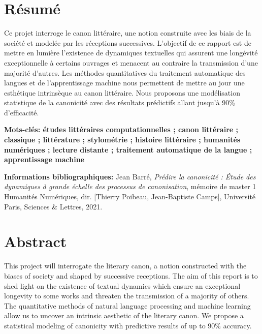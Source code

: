 \section*{Résumé}
Ce projet interroge le canon littéraire, une notion construite avec les biais de la société et modelée par les réceptions successives. L’objectif de ce rapport est de mettre en lumière l’existence de dynamiques textuelles qui assurent une longévité exceptionnelle à certains ouvrages et menacent au contraire la transmission d’une majorité d’autres. Les méthodes quantitatives du traitement automatique des langues et de l'apprentissage machine nous permettent de mettre au jour une esthétique intrinsèque au canon littéraire. Nous proposons une modélisation statistique de la canonicité avec des résultats prédictifs allant jusqu'à 90\% d'efficacité.




\medskip

\textbf{Mots-clés: études littéraires computationnelles ; canon littéraire ; classique ; littérature ; stylométrie ; histoire littéraire ; humanités numériques ; lecture distante ; traitement automatique de la langue ; apprentissage machine}

\textbf{Informations bibliographiques:} Jean Barré, \textit{Prédire la canonicité : Étude des dynamiques à grande échelle des
processus de canonisation}, mémoire de master 1 \og Humanités Numériques\fg{}, dir. [Thierry Poibeau, Jean-Baptiste Camps], Université Paris, Sciences \& Lettres, 2021.



\section*{Abstract}
This project will interrogate the literary canon, a notion constructed with the biases of society and shaped by successive receptions. The aim of this report is to shed light on the existence of textual dynamics which ensure an exceptional longevity to some works and threaten the transmission of a majority of others. The quantitative methods of natural language processing and machine learning allow us to uncover an intrinsic aesthetic of the literary canon. We propose a statistical modeling of canonicity with predictive results of up to 90\% accuracy.

